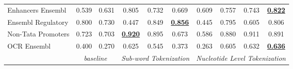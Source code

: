 \begin{table*}[h!]
\begin{center}
\begin{tabular}{l|cc|ccc|cccc}
Enhancers Ensembl & 0.539 & 0.631 & 0.805 & 0.732 & 0.669 & 0.609 & 0.757 & 0.743 & {\ul \textbf{0.822}} \\
Ensembl Regulatory & 0.800 & 0.730 & 0.447 & 0.849 & {\ul \textbf{0.856}} & 0.445 & 0.795 & 0.605 & 0.806 \\
Non-Tata Promoters & 0.723 & 0.703 & {\ul \textbf{0.920}} & 0.895 & 0.673 & 0.586 & 0.880 & 0.911 & 0.891 \\
OCR Ensembl & 0.400 & 0.270 & 0.625 & 0.545 & 0.373 & 0.263 & 0.605 & 0.632 & {\ul \textbf{0.636}} \\
\hline
\multicolumn{1}{l|}{} & \multicolumn{2}{c|}{\textit{baseline}} & \multicolumn{3}{c|}{\textit{Sub-word Tokenization}} & \multicolumn{4}{c}{\textit{Nucleotide Level Tokenization}} \\ \hline
\end{tabular}
\end{center}
\end{table*}